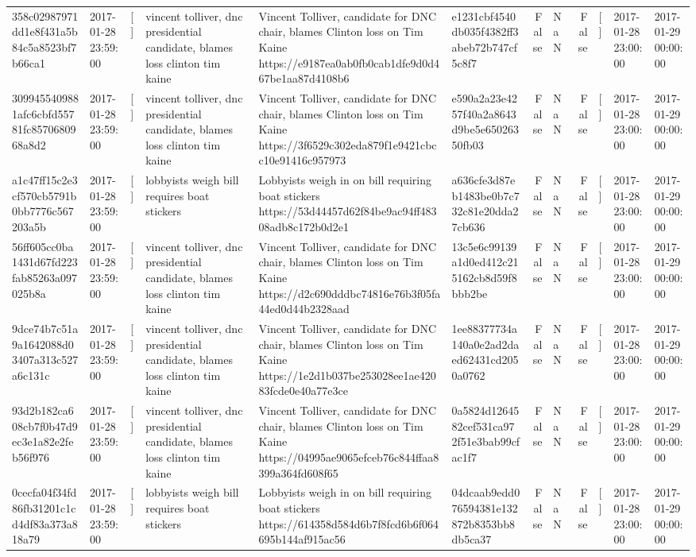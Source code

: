 \begin{tabular}{llllllrlrlll}
358c02987971dd1e8f431a5b84c5a8523bf7b66ca1 & 2017-01-28 23:59:00 & [] & vincent tolliver, dnc presidential candidate, blames loss clinton tim kaine & Vincent Tolliver, candidate for DNC chair, blames Clinton loss on Tim Kaine https://e9187ea0ab0fb0cab1dfe9d0d467be1aa87d4108b6 & e1231cbf4540db035f4382ff3abeb72b747cf5c8f7 & False & NaN & False & [] & 2017-01-28 23:00:00 & 2017-01-29 00:00:00 \\
3099455409881afc6cbfd55781fc8570680968a8d2 & 2017-01-28 23:59:00 & [] & vincent tolliver, dnc presidential candidate, blames loss clinton tim kaine & Vincent Tolliver, candidate for DNC chair, blames Clinton loss on Tim Kaine https://3f6529c302eda879f1e9421cbcc10e91416c957973 & e590a2a23e4257f40a2a8643d9be5e65026350fb03 & False & NaN & False & [] & 2017-01-28 23:00:00 & 2017-01-29 00:00:00 \\
a1c47ff15c2e3cf570cb5791b0bb7776c567203a5b & 2017-01-28 23:59:00 & [] & lobbyists weigh bill requires boat stickers & Lobbyists weigh in on bill requiring boat stickers https://53d44457d62f84be9ac94ff48308adb8c172b0d2e1 & a636cfe3d87eb1483be0b7c732c81e20dda27cb636 & False & NaN & False & [] & 2017-01-28 23:00:00 & 2017-01-29 00:00:00 \\
56ff605cc0ba1431d67fd223fab85263a097025b8a & 2017-01-28 23:59:00 & [] & vincent tolliver, dnc presidential candidate, blames loss clinton tim kaine & Vincent Tolliver, candidate for DNC chair, blames Clinton loss on Tim Kaine https://d2c690dddbc74816e76b3f05fa44ed0d44b2328aad & 13c5e6c99139a1d0ed412c215162cb8d59f8bbb2be & False & NaN & False & [] & 2017-01-28 23:00:00 & 2017-01-29 00:00:00 \\
9dce74b7c51a9a1642088d03407a313c527a6c131c & 2017-01-28 23:59:00 & [] & vincent tolliver, dnc presidential candidate, blames loss clinton tim kaine & Vincent Tolliver, candidate for DNC chair, blames Clinton loss on Tim Kaine https://1e2d1b037be253028ee1ae42083fcde0e40a77e3ce & 1ee88377734a140a0e2ad2daed62431cd2050a0762 & False & NaN & False & [] & 2017-01-28 23:00:00 & 2017-01-29 00:00:00 \\
93d2b182ca608cb7f0b47d9ec3e1a82e2feb56f976 & 2017-01-28 23:59:00 & [] & vincent tolliver, dnc presidential candidate, blames loss clinton tim kaine & Vincent Tolliver, candidate for DNC chair, blames Clinton loss on Tim Kaine https://04995ae9065efceb76c844ffaa8399a364fd608f65 & 0a5824d1264582cef531ca972f51e3bab99cfac1f7 & False & NaN & False & [] & 2017-01-28 23:00:00 & 2017-01-29 00:00:00 \\
0cecfa04f34fd86fb31201c1cd4df83a373a818a79 & 2017-01-28 23:59:00 & [] & lobbyists weigh bill requires boat stickers & Lobbyists weigh in on bill requiring boat stickers https://614358d584d6b7f8fcd6b6f064695b144af915ac56 & 04dcaab9edd076594381e132872b8353bb8db5ca37 & False & NaN & False & [] & 2017-01-28 23:00:00 & 2017-01-29 00:00:00 \\

\end{tabular}
